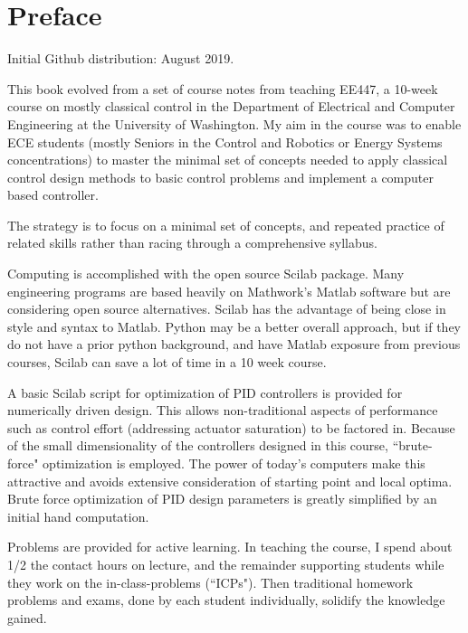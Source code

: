 \chapter*{Preface}

Initial Github distribution: August 2019. 
\vspace{0.25in}

This book evolved from a set of course notes from teaching EE447,
a 10-week course on mostly classical control in the Department of Electrical and Computer Engineering at the University of Washington. My aim in the course was to enable ECE students (mostly Seniors in the Control and Robotics or Energy Systems concentrations) to  master the minimal set of concepts needed to apply  classical control design methods to basic control problems and implement a computer based controller.

The strategy is to focus on a minimal set of concepts, and repeated practice of related skills rather than racing through a comprehensive syllabus. 

Computing is accomplished with the open source Scilab package.  Many engineering programs are based heavily 
on Mathwork's  Matlab software but are considering open source alternatives.  Scilab has the advantage of being close in style and syntax to Matlab.
Python may be a better overall approach, but if they do not have a prior python background, 
and have Matlab exposure from previous courses, Scilab can save a lot of time in a 10 week course.

A basic Scilab script for optimization of PID controllers is provided for numerically driven design.   This allows 
non-traditional aspects of performance such as control effort (addressing actuator saturation) to be factored in. 
Because of the small dimensionality of the controllers designed in this course, 
``brute-force"  optimization is employed.
The power of today's computers make this attractive and avoids extensive 
consideration of starting point and local optima.
Brute force optimization of PID design parameters is
greatly simplified by an initial hand computation.

Problems are provided for active learning.  In teaching the course, I spend about 1/2 the contact
hours on lecture, and the remainder supporting students while they work on the in-class-problems (``ICPs").   Then traditional 
homework problems and exams, done by each student individually,
solidify the knowledge gained. 

